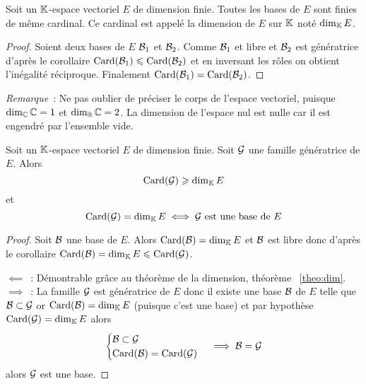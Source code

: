\begin{theo}
  \label{theo:dim}
  Soit un \(\mathbb{K}\)-espace vectoriel \(E\) de dimension finie. Toutes les bases de 
  \(E\) sont finies de même cardinal. Ce cardinal est appelé la dimension de 
  \(E\) sur \(\mathbb{K}\) noté \(\operatorname{dim}_{\mathbb{K}} E\).
\end{theo}
\begin{proof}
  Soient deux bases de \(E\) \(\mathcal{B}_1\) et \(\mathcal{B}_2\). Comme \(\mathcal{B}_1\) et libre et 
  \(\mathcal{B}_2\) est génératrice d'après le corollaire \(\operatorname{Card}(\mathcal{B}_1) \leqslant 
  \operatorname{Card}(\mathcal{B}_2)\) et en inversant les rôles on obtient l'inégalité réciproque. 
  Finalement \(\operatorname{Card}(\mathcal{B}_1)=\operatorname{Card}(\mathcal{B}_2)\).
\end{proof}

\emph{Remarque}~: Ne pas oublier de préciser le corps de l'espace vectoriel, 
puisque \(\operatorname{dim}_{\mathbb{C}} \mathbb{C}=1\) et \(\operatorname{dim}_{\mathbb{R}} \mathbb{C}=2\). La dimension de l'espace nul est 
nulle car il est engendré par l'ensemble vide.

\begin{theo}
  Soit un \(\mathbb{K}\)-espace vectoriel \(E\) de dimension finie. Soit \(\mathcal{G}\) une 
  famille génératrice de \(E\). Alors
  \begin{equation}
    \operatorname{Card}(\mathcal{G}) \geqslant \operatorname{dim}_{\mathbb{K}} E
  \end{equation}
  et
  \begin{equation}
    \operatorname{Card}(\mathcal{G})=\operatorname{dim}_{\mathbb{K}} E \iff \mathcal{G} \text{~est une base de } E
  \end{equation}
\end{theo}
\begin{proof}
  Soit \(\mathcal{B}\) une base de \(E\). Alors \(\operatorname{Card}(\mathcal{B})=\operatorname{dim}_{\mathbb{K}} E\) et \(\mathcal{B}\) est 
  libre donc d'après le corollaire \(\operatorname{Card}(\mathcal{B}) = \operatorname{dim}_{\mathbb{K}} E \leqslant 
  \operatorname{Card}(\mathcal{G})\).

  \(\impliedby\)~: Démontrable grâce au théorème de la dimension, théorème~
  \ref{theo:dim}.
  \(\implies\)~: La famille \(\mathcal{G}\) est génératrice de \(E\) donc il existe une 
  base \(\mathcal{B}\) de \(E\) telle que \(\mathcal{B} \subset \mathcal{G}\) or \(\operatorname{Card}(\mathcal{B}) = \operatorname{dim}_{\mathbb{K}} E\) 
  (puisque c'est une base) et par hypothèse \(\operatorname{Card}(\mathcal{G}) = \operatorname{dim}_{\mathbb{K}} E\) alors
  \begin{equation}
    \begin{cases} \mathcal{B} \subset \mathcal{G} \\ \operatorname{Card}(\mathcal{B}) = \operatorname{Card}(\mathcal{G}) \end{cases} \implies 
      \mathcal{B}=\mathcal{G}
  \end{equation}
  alors \(\mathcal{G}\) est une base.
\end{proof}

